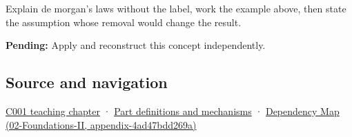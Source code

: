 Explain de morgan's laws without the label, work the example above, then state the assumption whose removal would change the result.

\textbf{Pending:} Apply and reconstruct this concept independently.

\subsection{Source and navigation}\label{appendix-9079d3659da4-source-and-navigation}

\hyperref[01-foundations-i-ch001-from-a-signal-to-an-interpretation]{C001 teaching chapter} · \hyperref[appendix-fd090d982a15]{Part definitions and mechanisms} · \href{../02-Foundations-II/main.pdf\#nameddest=appendix-4ad47bdd269a}{Dependency Map (02-Foundations-II, appendix-4ad47bdd269a)}
